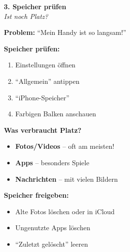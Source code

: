 \documentclass[a4paper,landscape,8pt]{extarticle}
\begin{document}
\hfill%
\begin{minipage}[t]{0.32\linewidth}
\begin{center}
\colorbox{storageorange!15}{%
\begin{minipage}{0.95\linewidth}
\vspace{2mm}
\begin{center}
{\Large\bfseries\textcolor{storageorange}{3. Speicher prüfen}}\\[1pt]
{\footnotesize\itshape Ist noch Platz?}
\end{center}
\vspace{2mm}
\end{minipage}%
}
\end{center}

\vspace{1mm}

\textbf{Problem:} ``Mein Handy ist so langsam!''

\textbf{Speicher prüfen:}
\begin{enumerate}
\item Einstellungen öffnen
\item ``Allgemein'' antippen
\item ``iPhone-Speicher''
\item Farbigen Balken anschauen
\end{enumerate}

\textbf{Was verbraucht Platz?}
\begin{itemize}
\item \textbf{Fotos/Videos} -- oft am meisten!
\item \textbf{Apps} -- besonders Spiele
\item \textbf{Nachrichten} -- mit vielen Bildern
\end{itemize}

\textbf{Speicher freigeben:}
\begin{itemize}
\item Alte Fotos löschen oder in iCloud
\item Ungenutzte Apps löschen
\item ``Zuletzt gelöscht'' leeren
\end{itemize}

\vspace{2mm}

\end{minipage}
\end{document}

